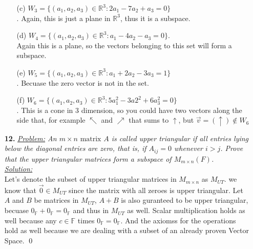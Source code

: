 \documentclass[11pt, fleqn]{article}
\begin{document}
\begin{itemize}
\begin{itemize}
    		\item[(c)] \textit{$W_3 = \{(a_1, a_2, a_3)\in \mathbb{R}^3: 2a_1 -7a_2 + a_3 = 0\}$}\\[1ex]. Again, this is just a plane in $\mathbb{R}^3$, thus it is a subspace.
    		\item[(d)] \textit{$W_4 = \{(a_1, a_2, a_3)\in \mathbb{R}^3: a_1 - 4a_2 - a_3 = 0\}$}.\\[1ex]
    		 Again this is a plane, so the vectors belonging to this set will form a subspace.

    		\item[(e)] \textit{$W_5 = \{(a_1, a_2, a_3)\in \mathbb{R}^3: a_1 + 2a_2 - 3a_3 = 1\}$}\\[1ex]. Becuase the zero vector is not in the set.

    		\item[(f)] \textit{$W_6 = \{(a_1, a_2, a_3)\in \mathbb{R}^3: 5a_1^2 -3a2^2 + 6a_3^2 = 0\}$}\\[1ex]. This is a cone in 3 dimension, so you could have two vectors along the side that, for example $\nwarrow$ and $\nearrow$ that sums to $\uparrow$, but $\vec{v} = (\uparrow) \notin W_6$
    	\end{itemize}

    \item [\textbf{12.}]\textit{\underline{Problem:} An $m \times n \text{ matrix } A$ is called upper triangular if all entries lying below the diagonal entries are zero, that is, if $A_{ij} = 0$ whenever $i > j$. Prove that the upper triangular matrices form a subspace of $M_{m \times n}(F)$.}\\[2ex]\textit{\underline{Solution:}}\\
    	Let's denote the subset of upper triangular matrices in $M_{m\times n}$ as $M_{UT}$. we know that $\vec 0 \in M_{UT}$ since the matrix with all zeroes is upper triangular. Let $A$ and $B$ be matrices in $M_{UT}$, $A + B$ is also guranteed to be upper triangular, becuase $0_\mathbb{F} + 0_\mathbb{F} = 0_\mathbb{F}$ and thus in $M_{UT}$ as well. Scalar multiplication holds as well because any $c \in \mathbb{F}$ times $0_\mathbb{F} = 0_\mathbb{F}$. And the axiomss for the operations hold as well because we are dealing with a subset of an already proven Vector Space. \qed


\end{itemize}
\end{document}
